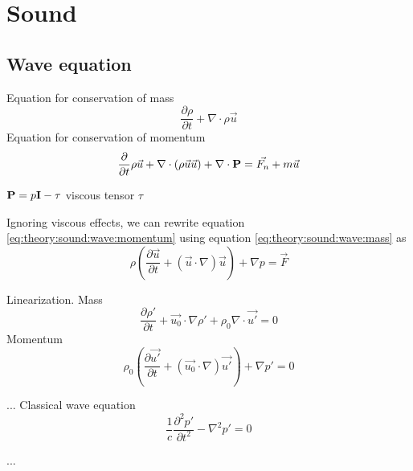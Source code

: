 \section{Sound}

\cite{Arntzen2014a, Rienstra2017}

\subsection{Wave equation}\label{sec:theory:sound:wave}

Equation for conservation of mass
\begin{equation}\label{eq:theory:sound:wave:mass}
 \frac{\partial \rho}{\partial t} + \nabla \cdot \rho \vec{u}
\end{equation}
Equation for conservation of momentum
\begin{equation}\label{eq:theory:sound:wave:momentum}
 \frac{\partial}{\partial t} \rho \vec{u} + \nabla \cdot \left( \rho \vec{u} \vec{u}  \right) + \nabla \cdot \bold{P} = \vec{F_n} + m \vec{u}
\end{equation}


$\bold{P} = p \bold{I} - \tau$
viscous tensor $\tau$

Ignoring viscous effects, we can rewrite equation \ref{eq:theory:sound:wave:momentum} using equation \ref{eq:theory:sound:wave:mass} as
\begin{equation}
 \rho \left( \frac{\partial \vec{u}}{\partial t} + \left( \vec{u} \cdot \nabla \right) \vec{u} \right) + \nabla p = \vec{F}
\end{equation}

Linearization.
Mass
\begin{equation}
 \frac{\partial \rho'}{\partial t} + \vec{u_0} \cdot \nabla \rho' + \rho_0 \nabla \cdot \vec{u'} = 0
\end{equation}
Momentum
\begin{equation}
 \rho_0 \left( \frac{\partial \vec{u'}}{\partial t} + \left(\vec{u_0} \cdot \nabla \right) \vec{u'}\right) + \nabla p' = 0
\end{equation}

...
Classical wave equation
\begin{equation}\label{eq:theory:sound:wave:classic}
 \frac{1}{c} \frac{\partial^2 p'}{\partial t^2} - \nabla^2 p' = 0
\end{equation}

...

